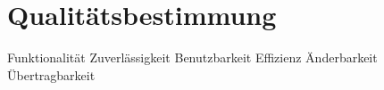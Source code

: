 \section{Qualitätsbestimmung}
Funktionalität 
Zuverlässigkeit
Benutzbarkeit 
Effizienz 
Änderbarkeit 
Übertragbarkeit